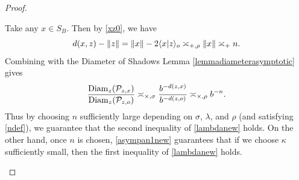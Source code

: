 \begin{proof}
\begin{subproof}
\end{subproof}
\begin{subproof}
Take any $x\in S_B$. Then by \eqref{xz0}, we have
\begin{equation}
\label{asympan1}
d(x,z) - \|z\| = \|x\| - 2\langle x|z\rangle_o \asymp_{+,\rho} \|x\| \asymp_+ n.
\end{equation}
Combining with the Diameter of Shadows Lemma \ref{lemmadiameterasymptotic} gives
\begin{equation}
\label{asympan1new}
\frac{\operatorname{Diam}_z(\mathcal P_{z,x})}{\operatorname{Diam}_z(\mathcal P_{z,o})}
\asymp_{\times,\sigma} \frac{b^{-d(z,x)}}{b^{-d(z,o)}}
\asymp_{\times,\rho} b^{-n}.
\end{equation}
Thus by choosing $n$ sufficiently large depending on $\sigma$, $\lambda$, and $\rho$ (and satisfying \eqref{ndef}), we guarantee that the second inequality of \eqref{lambdanew} holds. On the other hand, once $n$ is chosen, \eqref{asympan1new} guarantees that if we choose $\kappa$ sufficiently small, then the first inequality of \eqref{lambdanew} holds.


\end{subproof}
\end{proof}

